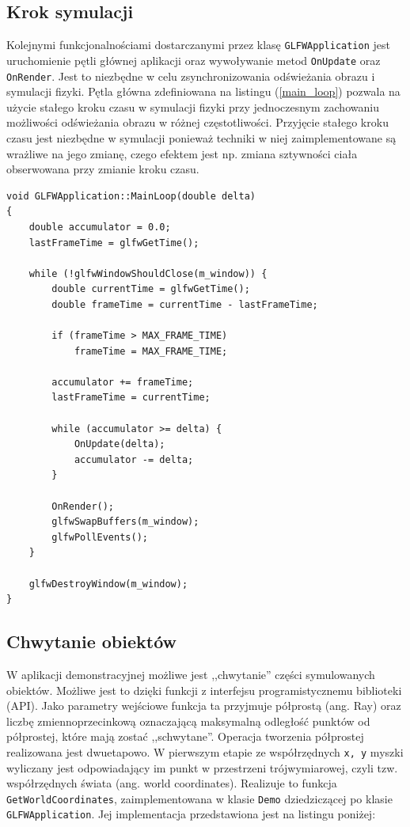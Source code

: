 \subsection{Krok symulacji}
Kolejnymi funkcjonalnościami dostarczanymi przez klasę \texttt{GLFWApplication} jest
uruchomienie pętli głównej aplikacji oraz wywoływanie metod \texttt{OnUpdate} oraz \texttt{OnRender}.
Jest to niezbędne w celu zsynchronizowania odświeżania obrazu i
symulacji fizyki. Pętla główna zdefiniowana na listingu (\ref{main_loop})
pozwala na użycie stałego kroku czasu w symulacji fizyki przy jednoczesnym
zachowaniu możliwości odświeżania obrazu w różnej częstotliwości. Przyjęcie
stałego kroku czasu jest niezbędne w symulacji ponieważ
techniki w niej zaimplementowane są wrażliwe na jego zmianę, czego efektem jest
np. zmiana sztywności ciała obserwowana przy zmianie kroku czasu.

\begin{lstlisting}[caption=Pętla główna, label=main_loop]
void GLFWApplication::MainLoop(double delta)
{
	double accumulator = 0.0;
	lastFrameTime = glfwGetTime();

	while (!glfwWindowShouldClose(m_window)) {
		double currentTime = glfwGetTime();
		double frameTime = currentTime - lastFrameTime;

		if (frameTime > MAX_FRAME_TIME)
			frameTime = MAX_FRAME_TIME;

		accumulator += frameTime;
		lastFrameTime = currentTime;

		while (accumulator >= delta) {
			OnUpdate(delta);
			accumulator -= delta;
		}

		OnRender();
		glfwSwapBuffers(m_window);
		glfwPollEvents();
	}

	glfwDestroyWindow(m_window);
}
\end{lstlisting}

\subsection{Chwytanie obiektów}
W aplikacji demonstracyjnej możliwe jest ,,chwytanie'' części symulowanych
obiektów. Możliwe jest to dzięki funkcji z interfejsu programistycznemu
biblioteki (API). Jako parametry wejściowe funkcja ta przyjmuje półprostą (ang.
		Ray) oraz liczbę zmiennoprzecinkową oznaczającą maksymalną odległość
punktów od półprostej, które mają zostać ,,schwytane''. Operacja tworzenia
półprostej realizowana jest dwuetapowo. W pierwszym etapie ze współrzędnych
\texttt{x, y} myszki wyliczany jest odpowiadający im punkt w przestrzeni
trójwymiarowej, czyli tzw. współrzędnych świata (ang. world
		coordinates). Realizuje to funkcja \texttt{GetWorldCoordinates},
	zaimplementowana w klasie \texttt{Demo} dziedziczącej po klasie
	\texttt{GLFWApplication}. Jej implementacja
	przedstawiona jest na listingu poniżej:

